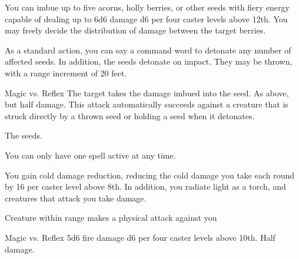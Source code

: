 \begin{spellheader}
\end{spellheader}
\begin{spelleffects}
    \spelleffect You can imbue up to five acorns, holly berries, or other seeds with fiery energy capable of dealing up to 6d6 damage \add d6 per four caster levels above 12th. You may freely decide the distribution of damage between the target berries.

    As a standard action, you can say a command word to detonate any number of affected seeds. In addition, the seeds detonate on impact. They may be thrown, with a range increment of 20 feet.
    \begin{spellattack}{Magic vs. Reflex}
        \spellsuccess The target takes the damage imbued into the seed.
        \spellfailure As above, but half damage.
        \spellspecial This attack automatically succeeds against a creature that is struck directly by a thrown seed or holding a seed when it detonates.
    \end{spellattack}
     The seeds.
\end{spelleffects}
\begin{spellfooter}
    \spellnotes You can only have one  spell active at any time.
\end{spellfooter}

\begin{spellheader}
    \spelldur{\durshort \dismissable}
\end{spellheader}
\begin{spelleffects}
    \spelleffect You gain cold damage reduction, reducing the cold damage you take each round by 16  per caster level above 8th. In addition, you radiate light as a torch, and creatures that attack you take damage.
    \begin{spelltrigger}{Creature within range makes a physical attack against you}
        \begin{spellattack}{Magic vs. Reflex}
            \spellsuccess 5d6 fire damage \add d6 per four caster levels above 10th.
            \spellfailure Half damage.
        \end{spellattack}
    \end{spelltrigger}
\end{spelleffects}
\begin{spellfooter}

\end{spellfooter}

